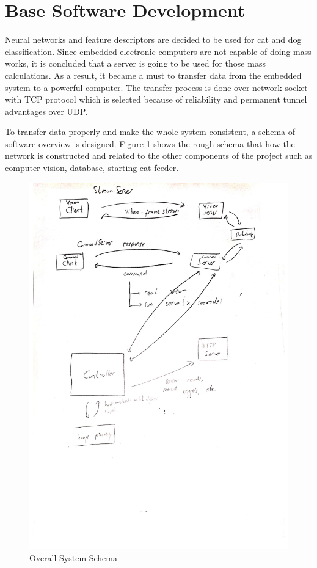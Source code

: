 \section{Base Software Development} \label{sec:software}

Neural networks and feature descriptors are decided to be used for cat and dog classification. Since embedded electronic computers are not capable of doing mass works, it is concluded that a server is going to be used for those mass calculations. As a result, it became a must to transfer data from the embedded system to a powerful computer. The transfer process is done over network socket with TCP protocol which is selected because of reliability and permanent tunnel advantages over UDP\cite{cite:TCPProtocol}.

To transfer data properly and make the whole system consistent, a schema of software overview is designed. Figure \ref{fig:overallView} shows the rough schema that how the network is constructed and related to the other components of the project such as computer vision, database, starting cat feeder.

\begin{figure}[htp]
    \centering
    \includegraphics[width=0.9\linewidth]{img/SchemaSharpened.jpg}
    \caption{Overall System Schema}
    \label{fig:overallView}
\end{figure}

